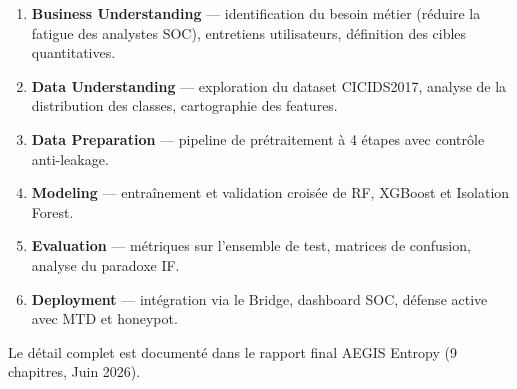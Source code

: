 \documentclass[12pt,a4paper]{article}
\begin{document}
\begin{enumerate}[nosep,leftmargin=1.5em]
  \item \textbf{Business Understanding} --- identification du besoin m\'{e}tier
        (r\'{e}duire la fatigue des analystes SOC), entretiens utilisateurs,
        d\'{e}finition des cibles quantitatives.
  \item \textbf{Data Understanding} --- exploration du dataset CICIDS2017,
        analyse de la distribution des classes, cartographie des features.
  \item \textbf{Data Preparation} --- pipeline de pr\'{e}traitement \`{a} 4
        \'{e}tapes avec contr\^{o}le anti-leakage.
  \item \textbf{Modeling} --- entra\^{i}nement et validation crois\'{e}e de
        RF, XGBoost et Isolation Forest.
  \item \textbf{Evaluation} --- m\'{e}triques sur l'ensemble de test,
        matrices de confusion, analyse du paradoxe IF.
  \item \textbf{Deployment} --- int\'{e}gration via le Bridge, dashboard SOC,
        d\'{e}fense active avec MTD et honeypot.
\end{enumerate}

Le d\'{e}tail complet est document\'{e} dans le rapport final AEGIS Entropy
(9 chapitres, Juin 2026).
\end{document}
